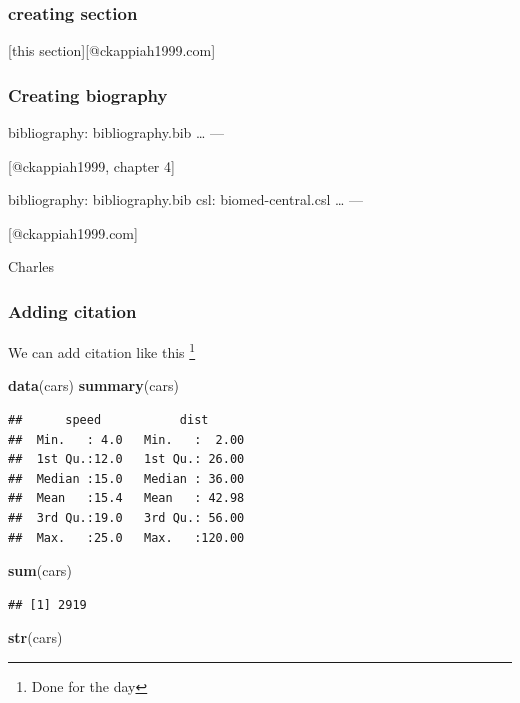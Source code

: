 \documentclass[
]{article}
\newenvironment{Shaded}{\begin{snugshade}}{\end{snugshade}}
\newcommand{\FunctionTok}[1]{\textcolor[rgb]{0.13,0.29,0.53}{\textbf{#1}}}
\newcommand{\NormalTok}[1]{#1}
\begin{document}
\subsubsection{creating section}\label{creating-section}

{[}this section{]}{[}@ckappiah1999.com{]}

\subsubsection{Creating biography}\label{creating-biography}

bibliography: bibliography.bib \ldots{} ---

{[}@ckappiah1999, chapter 4{]}

bibliography: bibliography.bib csl: biomed-central.csl \ldots{} ---

{[}@ckappiah1999.com{]}

Charles

\subsubsection{Adding citation}\label{adding-citation}

We can add citation like this \footnote{Done for the day}

\begin{Shaded}
\begin{Highlighting}[]
\FunctionTok{data}\NormalTok{(cars)}
\FunctionTok{summary}\NormalTok{(cars)}
\end{Highlighting}
\end{Shaded}

\begin{verbatim}
##      speed           dist       
##  Min.   : 4.0   Min.   :  2.00  
##  1st Qu.:12.0   1st Qu.: 26.00  
##  Median :15.0   Median : 36.00  
##  Mean   :15.4   Mean   : 42.98  
##  3rd Qu.:19.0   3rd Qu.: 56.00  
##  Max.   :25.0   Max.   :120.00
\end{verbatim}

\begin{Shaded}
\begin{Highlighting}[]
\FunctionTok{sum}\NormalTok{(cars)}
\end{Highlighting}
\end{Shaded}

\begin{verbatim}
## [1] 2919
\end{verbatim}

\begin{Shaded}
\begin{Highlighting}[]
\FunctionTok{str}\NormalTok{(cars)}
\end{Highlighting}
\end{Shaded}
\end{document}
